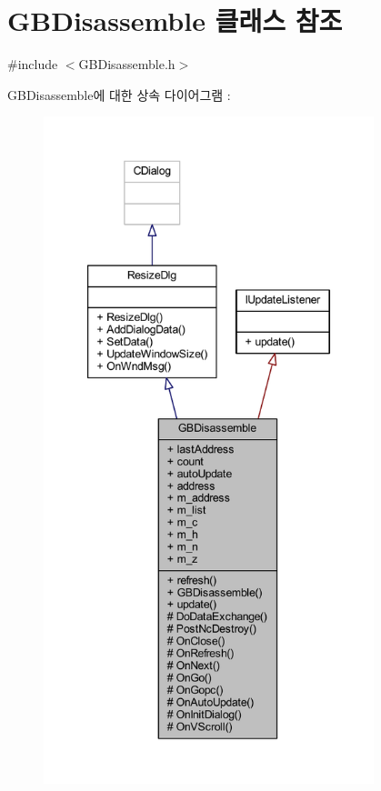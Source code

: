 \hypertarget{class_g_b_disassemble}{}\section{G\+B\+Disassemble 클래스 참조}
\label{class_g_b_disassemble}


{\ttfamily \#include $<$G\+B\+Disassemble.\+h$>$}



G\+B\+Disassemble에 대한 상속 다이어그램 \+: \nopagebreak
\begin{figure}[H]
\begin{center}
\leavevmode
\includegraphics[height=550pt]{class_g_b_disassemble__inherit__graph}
\end{center}
\end{figure}


